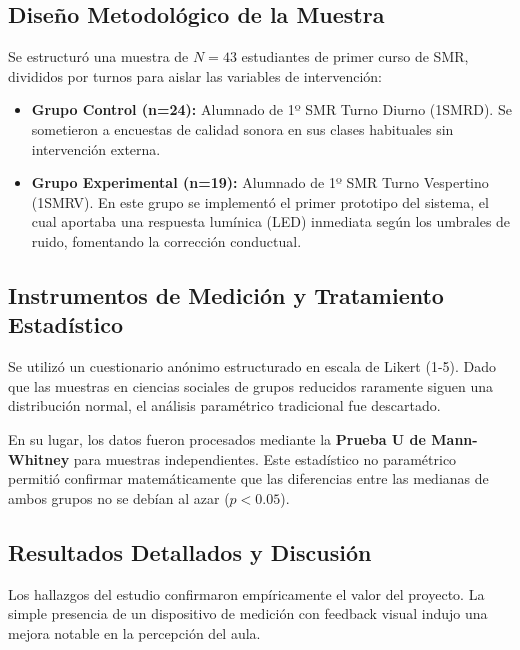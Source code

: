 \documentclass[11pt,a4paper]{article}
\begin{document}
\subsection{Diseño Metodológico de la Muestra}
Se estructuró una muestra de $N=43$ estudiantes de primer curso de SMR, divididos por turnos para aislar las variables de intervención:
\begin{itemize}
    \item \textbf{Grupo Control (n=24):} Alumnado de 1º SMR Turno Diurno (1SMRD). Se sometieron a encuestas de calidad sonora en sus clases habituales sin intervención externa.
    \item \textbf{Grupo Experimental (n=19):} Alumnado de 1º SMR Turno Vespertino (1SMRV). En este grupo se implementó el primer prototipo del sistema, el cual aportaba una respuesta lumínica (LED) inmediata según los umbrales de ruido, fomentando la corrección conductual.
\end{itemize}

\subsection{Instrumentos de Medición y Tratamiento Estadístico}
Se utilizó un cuestionario anónimo estructurado en escala de Likert (1-5). Dado que las muestras en ciencias sociales de grupos reducidos raramente siguen una distribución normal, el análisis paramétrico tradicional fue descartado. 

En su lugar, los datos fueron procesados mediante la \textbf{Prueba U de Mann-Whitney} para muestras independientes. Este estadístico no paramétrico permitió confirmar matemáticamente que las diferencias entre las medianas de ambos grupos no se debían al azar ($p < 0.05$).

\subsection{Resultados Detallados y Discusión}

Los hallazgos del estudio confirmaron empíricamente el valor del proyecto. La simple presencia de un dispositivo de medición con feedback visual indujo una mejora notable en la percepción del aula.
\end{document}

